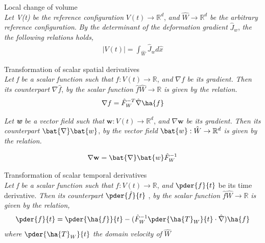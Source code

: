 \begin{lem}
Local change of volume \\
\textit{Let V(t) be the reference configuration} $V(t) \rightarrow \mathbb{R}^d$, \textit{and} $\hat{W}  \rightarrow \mathbb{R}^d$ \textit{be the arbitrary reference configuration}. \textit{By the determinant of the deformation gradient} $\hat{J}_w$, \textit{the the following relations holds,}
\begin{align}
|V(t)| = \int_{\hat{W}} \hat{J}_w d \hat{x}
\end{align} 
\end{lem}

\begin{lem}
Transformation of scalar spatial derivatives \\
\textit{Let f be a scalar function such that} $f: V(t) \rightarrow \mathbb{R}$, \textit{and} $\nabla f$ \textit{be its gradient.}
\textit{Then its counterpart} $\nabla \hat{f}$, \textit{by the scalar function}  $\hat{f} \hat{W} \rightarrow \mathbb{R}$ \textit{is given by the relation.} 
\begin{align}
\nabla f = \hat{F}_W^{-T} \hat{\nabla}\ha{f}
\end{align} 
\end{lem}

\begin{lem}
\textit{Let \textbf{w} be a vector field such that} $\mathbf{w}: V(t) \rightarrow \mathbb{R}^d$, \textit{and} $\nabla \mathbf{w}$ \textit{be its gradient.}
\textit{Then its counterpart} $\bat{\nabla}\bat{w}$, \textit{by the vector field}  $\bat{w}: \hat{W} \rightarrow \mathbb{R}^d$ \textit{is given by the relation.} 

\begin{align}
\nabla \mathbf{w} = \bat{\nabla}\bat{w} \hat{F}_W^{-1} 
\end{align} 
\end{lem}

\begin{lem}
Transformation of scalar temporal derivatives \\
\textit{Let f be a scalar function such that} $f: V(t) \rightarrow \mathbb{R}$, \textit{and} $\pder{f}{t}$ be its time derivative. \textit{Then its counterpart} $\pder{\hat{f}}{t}$ , \textit{by the scalar function}  $\hat{f} \hat{W} \rightarrow \mathbb{R}$ \textit{is given by the relation,} 
\begin{align}
\pder{f}{t} = \pder{\ha{f} }{t} - (\hat{F}_W^{-1} \pder{\ha{T}_W}{t} \cdot \hat{\nabla}) \ha{f}
\end{align}
 \textit{where} $\pder{\ha{T}_W}{t}$ \textit{the domain velocity of}  $\hat{W}$
\end{lem}


